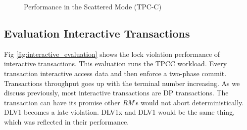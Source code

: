 \documentclass[conference]{IEEEtran}
\begin{document}
\begin{figure}[tbp]
  \centering


\caption{Performance in the Scattered Mode (TPC-C) }
\label{fig:new_order_add_terminal_scattered}
\end{figure}

\subsection{Evaluation Interactive Transactions}
Fig \ref{fig:interactive_evaluation} shows the lock violation performance of interactive transactions.
This evaluation runs the TPCC workload.
Every transaction interactive access data and then enforce a two-phase commit.
Transactions throughput goes up with the terminal number increasing.
As we discuss previously, most interactive transactions are DP transactions.
The transaction can have its promise other \emph{RM}'s would not abort deterministically.
DLV1 becomes a late violation.
DLV1x and DLV1 would be the same thing,
which was reflected in their performance.
\end{document}
